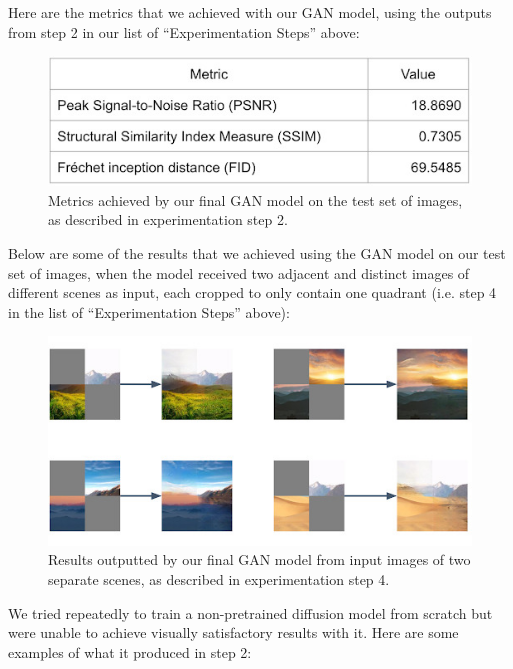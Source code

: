 \documentclass[sigconf]{acmart}
\begin{document}
Here are the metrics that we achieved with our GAN model, using the outputs from step 2 in our list of “Experimentation Steps” above:

\begin{figure}[h!]
    \centering
    \includegraphics[width=\linewidth]{gan_metrics}
    \caption{Metrics achieved by our final GAN model on the test set of images, as described in experimentation step 2.}
    \label{fig:gan_metrics}
\end{figure}

Below are some of the results that we achieved using the GAN model on our test set of images, when the model received two adjacent and distinct images of different scenes as input, each cropped to only contain one quadrant (i.e. step 4 in the list of “Experimentation Steps” above):

\begin{figure}[h!]
    \centering
    \includegraphics[width=\linewidth]{gan_step_4}
    \caption{Results outputted by our final GAN model from input images of two separate scenes, as described in experimentation step 4.}
    \label{fig:gan_step_4}
\end{figure}

We tried repeatedly to train a non-pretrained diffusion model from scratch but were unable to achieve visually satisfactory results with it. Here are some examples of what it produced in step 2:
\end{document}
